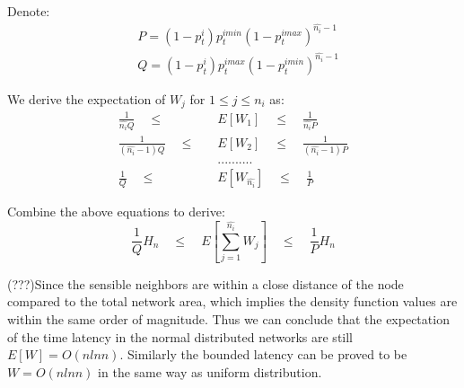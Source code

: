 Denote:
\begin{align*}
&P = (1-p_t^i)p_t^{imin}{(1-p_t^{imax})}^{\hat{n_i}-1}  \\
&Q = (1-p_t^i)p_t^{imax}{(1-p_t^{imin})}^{\hat{n_i}-1}
\end{align*}

We derive the expectation of $W_j$ for $1 \leq j \leq n_i$ as:
\begin{align*}
\frac{1}{\hat{n_i}Q} \quad \leq \quad &E[W_1] \quad \leq \quad \frac{1}{\hat{n_i}P} \\
\frac{1}{(\hat{n_i}-1)Q} \quad \leq \quad &E[W_2] \quad \leq \quad \frac{1}{(\hat{n_i}-1)P} \\
& ..........\\
\frac{1}{Q} \quad \leq \quad &E[W_{\hat{n_i}}] \quad \leq \quad \frac{1}{P}
\end{align*}

Combine the above equations to derive:
$$
\frac{1}{Q}H_n  \quad \leq \quad E[\sum_{j=1}^{\hat{n_i}}W_j]  \quad \leq \quad \frac{1}{P}H_n
$$

(???)Since the sensible neighbors are within a close distance of the node
compared to the total network area,
which implies the density function values are within the same order of magnitude.
Thus we can conclude that the expectation of the time latency in the normal
distributed networks are still $E[W]=O(nlnn)$.
Similarly the bounded latency can be proved to be $W=O(nlnn)$ in the same way as
uniform distribution.


